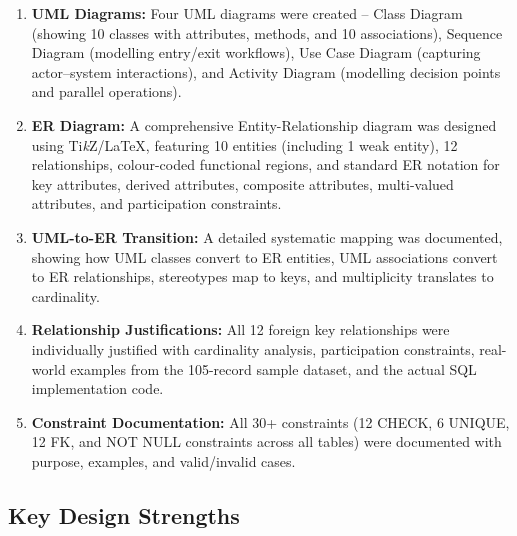 \documentclass[a4paper, 12pt]{article}
\begin{document}
\begin{enumerate}[leftmargin=*, nosep]
    \item \textbf{UML Diagrams:} Four UML diagrams were created -- Class Diagram (showing 10 classes with attributes, methods, and 10 associations), Sequence Diagram (modelling entry/exit workflows), Use Case Diagram (capturing actor--system interactions), and Activity Diagram (modelling decision points and parallel operations).

    \item \textbf{ER Diagram:} A comprehensive Entity-Relationship diagram was designed using Ti\textit{k}Z/\LaTeX, featuring 10 entities (including 1 weak entity), 12 relationships, colour-coded functional regions, and standard ER notation for key attributes, derived attributes, composite attributes, multi-valued attributes, and participation constraints.

    \item \textbf{UML-to-ER Transition:} A detailed systematic mapping was documented, showing how UML classes convert to ER entities, UML associations convert to ER relationships, stereotypes map to keys, and multiplicity translates to cardinality.

    \item \textbf{Relationship Justifications:} All 12 foreign key relationships were individually justified with cardinality analysis, participation constraints, real-world examples from the 105-record sample dataset, and the actual SQL implementation code.

    \item \textbf{Constraint Documentation:} All 30+ constraints (12 CHECK, 6 UNIQUE, 12 FK, and NOT NULL constraints across all tables) were documented with purpose, examples, and valid/invalid cases.
\end{enumerate}

\subsection{Key Design Strengths}
\end{document}
